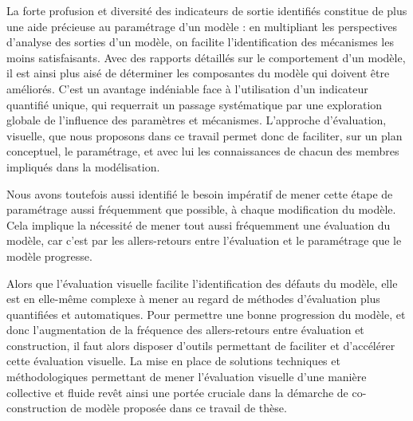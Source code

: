 La forte profusion et diversité des indicateurs de sortie identifiés constitue de plus une aide précieuse au paramétrage d'un modèle : en multipliant les perspectives d'analyse des sorties d'un modèle, on facilite l'identification des mécanismes les moins satisfaisants.
Avec des rapports détaillés sur le comportement d'un modèle, il est ainsi plus aisé de déterminer les composantes du modèle qui doivent être améliorés.
C'est un avantage indéniable face à l'utilisation d'un indicateur quantifié unique, qui requerrait un passage systématique par une exploration globale de l'influence des paramètres et mécanismes.
L'approche d'évaluation, visuelle, que nous proposons dans ce travail permet donc de faciliter, sur un plan conceptuel, le paramétrage, et avec lui les connaissances de chacun des membres impliqués dans la modélisation.

Nous avons toutefois aussi identifié le besoin impératif de mener cette étape de paramétrage aussi fréquemment que possible, à chaque modification du modèle.
Cela implique la nécessité de mener tout aussi fréquemment une évaluation du modèle, car c'est par les allers-retours entre l'évaluation et le paramétrage que le modèle progresse.

Alors que l'évaluation visuelle facilite l'identification des défauts du modèle, elle est en elle-même complexe à mener au regard de méthodes d'évaluation plus quantifiées et automatiques.
Pour permettre une bonne progression du modèle, et donc l'augmentation de la  fréquence des allers-retours entre évaluation et construction, il faut alors disposer d'outils permettant de faciliter et d'accélérer cette évaluation visuelle.
La mise en place de solutions techniques et méthodologiques permettant de mener l'évaluation visuelle d'une manière collective et fluide revêt ainsi une portée cruciale dans la démarche de co-construction de modèle proposée dans ce travail de thèse.
